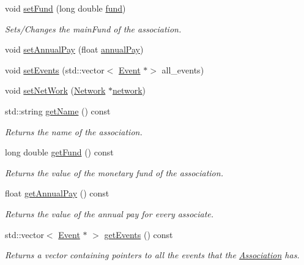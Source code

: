 \begin{DoxyCompactItemize}
void \hyperlink{classAssociation_acbeba5c80457ba1c307c212bcad08b82}{set\+Fund} (long double \hyperlink{classAssociation_a891f18ca3dbbbdfa2e8fab54b1683133}{fund})
\begin{DoxyCompactList}\small\item\em Sets/\+Changes the main\+Fund of the association. \end{DoxyCompactList}\item 
void \hyperlink{classAssociation_a4279bd391a3110e4110d3f300b3423a3}{set\+Annual\+Pay} (float \hyperlink{classAssociation_a19f8a7aad1491bc14f558b0b852da0a4}{annual\+Pay})
\item 
void \hyperlink{classAssociation_a5611bc364e24e70f110332d1b2c63a08}{set\+Events} (std\+::vector$<$ \hyperlink{classEvent}{Event} $\ast$$>$ all\+\_\+events)
\item 
void \hyperlink{classAssociation_afa9bdcebf905cddc52870dd156a14d54}{set\+Net\+Work} (\hyperlink{classNetwork}{Network} $\ast$\hyperlink{classAssociation_a6747cedd4ce14a3b890c8ac87f676192}{network})
\item 
std\+::string \hyperlink{classAssociation_ab9b849706f996d80ed3439d43d06a958}{get\+Name} () const
\begin{DoxyCompactList}\small\item\em Returns the name of the association. \end{DoxyCompactList}\item 
long double \hyperlink{classAssociation_a4834d8fe0057ca4c55fa3e83bc47aae5}{get\+Fund} () const
\begin{DoxyCompactList}\small\item\em Returns the value of the monetary fund of the association. \end{DoxyCompactList}\item 
float \hyperlink{classAssociation_aa3bd82b207ae1ac0e44df1b481d4a8a1}{get\+Annual\+Pay} () const
\begin{DoxyCompactList}\small\item\em Returns the value of the annual pay for every associate. \end{DoxyCompactList}\item 
std\+::vector$<$ \hyperlink{classEvent}{Event} $\ast$ $>$ \hyperlink{classAssociation_a3deb177639e3c8042f7400f336fdda08}{get\+Events} () const
\begin{DoxyCompactList}\small\item\em Returns a vector containing pointers to all the events that the \hyperlink{classAssociation}{Association} has. \end{DoxyCompactList}\item 
$$
\end{DoxyCompactItemize}
